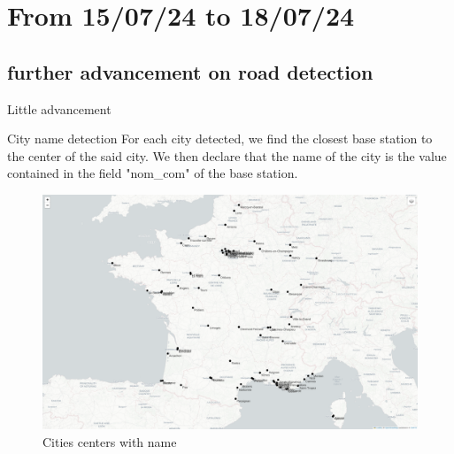 \smallframetitle

\section{From 15/07/24 to 18/07/24}
\insertsectionframe

\subsection{further advancement on road detection}
\insertsubsectionframe

\begin{frame}{Little advancement}
    \begin{block}{City name detection}
        For each city detected, we find the closest base station to the center of the said city. 
        We then declare that the name of the city is the value contained in the field "nom\_com" of the base station.
    \end{block}

    \begin{figure}
        \includegraphics[height=0.4\paperheight]{images/road_detection/cities_centers_with_name.png}
        \caption{Cities centers with name}
    \end{figure}
\end{frame}

